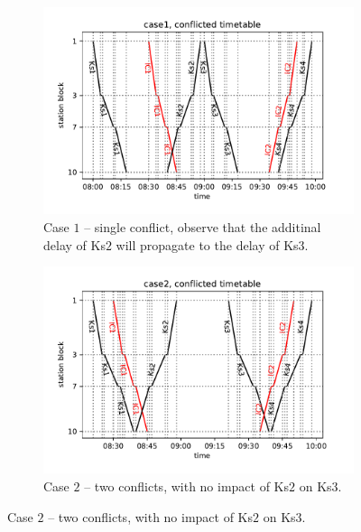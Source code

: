 \begin{figure}
  \begin{subfigure}[b]{0.4\columnwidth}
    \includegraphics[width=0.8\linewidth]{figures/case1_conflict}
    \caption{
      Case $1$ -- single conflict, observe that the additinal delay of Ks$2$ will
      propagate to the delay of Ks$3$. } \label{fig::c1_conflict}
  \end{subfigure}
  \begin{subfigure}[b]{0.4\columnwidth}
    \includegraphics[width=0.8\linewidth]{figures/case2_conflict}
    \caption{Case $2$ -- two conflicts, with no impact of Ks$2$ on Ks$3$.}
    \label{fig::c2_conflict}
  \end{subfigure}


\end{figure}
